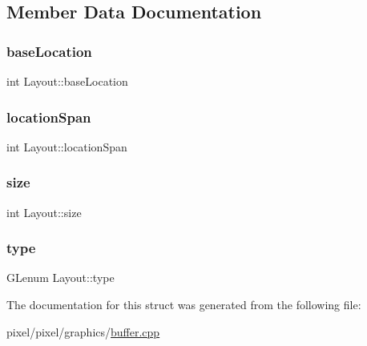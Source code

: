 \subsection{Member Data Documentation}
\mbox{\label{struct_layout_a7f928bc38185dc8527b16f2dd35191cf}} 
\subsubsection{\texorpdfstring{base\+Location}{baseLocation}}
{\footnotesize\ttfamily int Layout\+::base\+Location}

\mbox{\label{struct_layout_a483e349db82792cfbd393797c2396957}} 
\subsubsection{\texorpdfstring{location\+Span}{locationSpan}}
{\footnotesize\ttfamily int Layout\+::location\+Span}

\mbox{\label{struct_layout_a143bf56c3c9785cc75e2360dbe818e84}} 
\subsubsection{\texorpdfstring{size}{size}}
{\footnotesize\ttfamily int Layout\+::size}

\mbox{\label{struct_layout_a039d56a72da89806f7019c12c8ab3ea7}} 
\subsubsection{\texorpdfstring{type}{type}}
{\footnotesize\ttfamily G\+Lenum Layout\+::type}



The documentation for this struct was generated from the following file\+:\begin{DoxyCompactItemize}
\item 
pixel/pixel/graphics/\hyperlink{buffer_8cpp}{buffer.\+cpp}\end{DoxyCompactItemize}
